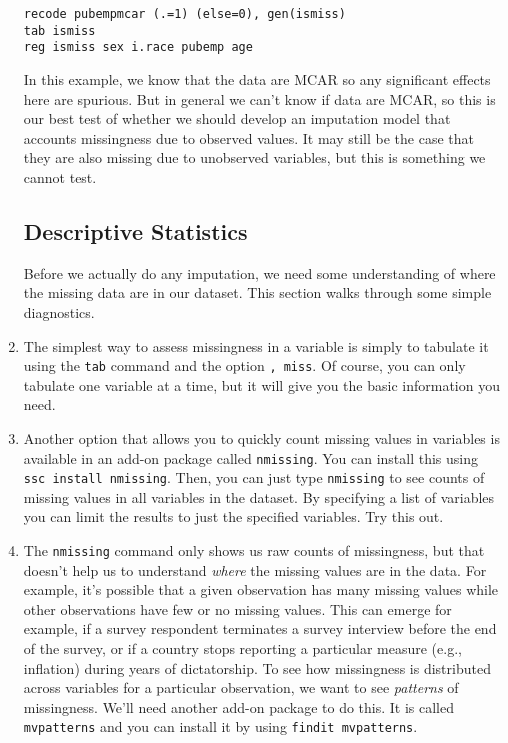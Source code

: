 \documentclass[a4paper,12pt]{article}
\begin{document}
\begin{enumerate}
\begin{verbatim}
recode pubempmcar (.=1) (else=0), gen(ismiss)
tab ismiss
reg ismiss sex i.race pubemp age
\end{verbatim}

In this example, we know that the data are MCAR so any significant effects here are spurious. But in general we can't know if data are MCAR, so this is our best test of whether we should develop an imputation model that accounts missingness due to observed values.  It may still be the case that they are also missing due to unobserved variables, but this is something we cannot test.

\subsection*{Descriptive Statistics}

Before we actually do any imputation, we need some understanding of where the missing data are in our dataset. This section walks through some simple diagnostics.

\item The simplest way to assess missingness in a variable is simply to tabulate it using the \texttt{tab} command and the option \texttt{, miss}. Of course, you can only tabulate one variable at a time, but it will give you the basic information you need.

\item Another option that allows you to quickly count missing values in variables is available in an add-on package called \texttt{nmissing}. You can install this using \texttt{ssc install nmissing}. Then, you can just type \texttt{nmissing} to see counts of missing values in all variables in the dataset. By specifying a list of variables you can limit the results to just the specified variables. Try this out.

\item The \texttt{nmissing} command only shows us raw counts of missingness, but that doesn't help us to understand {\em where} the missing values are in the data. For example, it's possible that a given observation has many missing values while other observations have few or no missing values. This can emerge for example, if a survey respondent terminates a survey interview before the end of the survey, or if a country stops reporting a particular measure (e.g., inflation) during years of dictatorship. To see how missingness is distributed across variables for a particular observation, we want to see {\em patterns} of missingness. We'll need another add-on package to do this. It is called \texttt{mvpatterns} and you can install it by using \texttt{findit mvpatterns}.



\end{enumerate}
\end{document}
